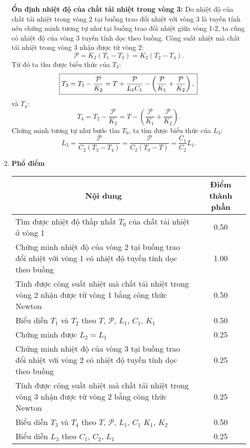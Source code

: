 \begin{enumerate}
    \textbf{Ổn định nhiệt độ của chất tải nhiệt trong vòng 3:} Do nhiệt độ của chất tải nhiệt trong vòng 2 tại buồng trao đổi nhiệt với vòng 3 là tuyến tính nên chứng minh tương tự như tại buồng trao đổi nhiệt giữa vòng 1-2, ta cũng có nhiệt độ của vòng 3 tuyến tính dọc theo buồng. Công suất nhiệt mà chất tải nhiệt trong vòng 3 nhận được từ vòng 2:
    \begin{equation}
        \mathcal{P}=K_2(T_1-T_3)=K_2(T_2-T_4).
    \end{equation}
    Từ đó ta thu được biểu thức của $T_3$:
    \begin{equation}
    \boxed{
        T_3=T_1-\dfrac{\mathcal{P}}{K_2}=T+\dfrac{\mathcal{P}}{L_1 C_1}-\left(\dfrac{\mathcal{P}}{K_1}+\dfrac{\mathcal{P}}{K_2}\right),\\}
    \end{equation}
    và $T_4$:
        \begin{equation}
        \boxed{T_4=T_2-\dfrac{\mathcal{P}}{K_2}=T-\left(\dfrac{\mathcal{P}}{K_1}+\dfrac{\mathcal{P}}{K_2}\right).}
        \end{equation}
    Chứng minh tương tự như bước tìm $T_0$, ta tìm được biểu thức của $L_3$:
    \begin{equation}
        \boxed{L_3=\dfrac{\mathcal{P}}{C_2(T_3-T_4)}=\dfrac{\mathcal{P}}{C_2(T_0-T)}=\dfrac{C_1}{C_2}L_1.}
    \end{equation}

    \item \textbf{Phổ điểm}
    \begin{center}
    \begin{tabular}{|p{10.8cm}|c|}
    \hline
    \multicolumn{1}{|c|}{Nội dung} & Điểm thành phần\\ 
    \hline
    Tìm được nhiệt độ thấp nhất $T_0$ của chất tải nhiệt ở vòng 1 & 0.50 \\
    \hline
    Chứng minh nhiệt độ của vòng 2 tại buồng trao đổi nhiệt với vòng 1 có nhiệt độ tuyến tính dọc theo buồng& 1.00 \\
    \hline         
    Tính được công suất nhiệt mà chất tải nhiệt trong vòng 2 nhận được từ vòng 1 bằng công thức Newton & 0.50 \\
    \hline
    Biểu diễn $T_1$ và $T_2$ theo $T$, $\mathcal P$, $L_1$, $C_1$, $K_1$ & 0.50 \\
    \hline 
    Chứng minh được $L_2=L_1$ & 0.25 \\
    \hline
    Chứng minh nhiệt độ của vòng 3 tại buồng trao đổi nhiệt với vòng 2 có nhiệt độ tuyến tính dọc theo buồng& 0.25 \\
    \hline
    Tính được công suất nhiệt mà chất tải nhiệt trong vòng 3 nhận được từ vòng 2 bằng công thức Newton & 0.25\\
    \hline
    Biểu diễn $T_3$ và $T_4$ theo $T$, $\mathcal P$, $L_1$, $C_1$ $K_1$, $K_2$ & 0.50  \\
    \hline
    Biểu diễn $L_3$ theo $C_1$, $C_2$, $L_1$ & 0.25  \\
    \hline
    \end{tabular}
    \end{center}
\end{enumerate}
